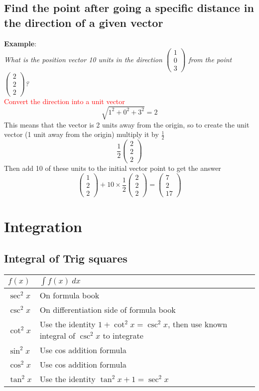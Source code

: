 \documentclass{article}[18pt]
\begin{document}
\subsection{Find the point after going a specific distance in the direction of a given vector}
\textbf{Example}:\\
\textit{What is the position vector 10 units in the direction
$\begin{pmatrix}1\\0\\3\end{pmatrix}$ from the point $\begin{pmatrix}2\\2\\2\end{pmatrix}$?}\\
\textcolor{red}{Convert the direction into a unit vector}
$$\sqrt{1^2+0^2+3^2}=2$$
This means that the vector is 2 units away from the origin, so to create the unit vector (1 unit away from the origin) multiply it by $\frac{1}{2}$
$$\frac{1}{2}\begin{pmatrix}2\\2\\2\end{pmatrix}$$
Then add 10 of these units to the initial vector point to get the answer
$$\begin{pmatrix}1\\2\\2\end{pmatrix}+10\times\frac{1}{2}\begin{pmatrix}2\\2\\2\end{pmatrix}=\begin{pmatrix}7\\2\\17\end{pmatrix}$$
\section{Integration}
\subsection{Integral of Trig squares}
{\renewcommand{\arraystretch}{2}
\begin{tabularx}{\textwidth}{|X|X|}
\hline
$f(x)$&$\int f(x) \ dx$\\
\hline
$\sec^2x$&On formula book\\
\hline
$\csc^2x$&On differentiation side of formula book\\
\hline
$\cot^2x$&Use the identity
$1+\cot^2x=\csc^2x$, then use known integral of $\csc^2x$ to integrate\\
\hline
$\sin^2x$&Use cos addition formula\\
\hline
$\cos^2x$&Use cos addition formula\\
\hline
$\tan^2x$&Use the identity $\tan^2x+1=\sec^2x$\\
\hline
\end{tabularx}}
\end{document}
